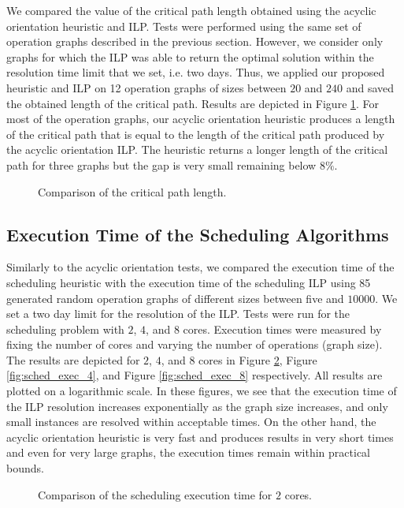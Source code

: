 We compared the value of the critical path length obtained using the acyclic orientation heuristic and ILP. Tests were performed using the same set of operation graphs described in the previous section. However, we consider only graphs for which the ILP was able to return the optimal solution within the resolution time limit that we set, i.e. two days. Thus, we applied our proposed heuristic and ILP on 12 operation graphs of sizes between $20$ and $240$ and saved the obtained length of the critical path. Results are depicted in Figure \ref{fig:orient_critpath}. For most of the operation graphs, our acyclic orientation heuristic produces a length of the critical path that is equal to the length of the critical path produced by the acyclic orientation ILP. The heuristic returns a longer length of the critical path for three graphs but the gap is very small remaining below $8\%$.  

\begin{figure}[phbt]
\centering

\caption{Comparison of the critical path length.}
\label{fig:orient_critpath}
\end{figure}

\subsection{Execution Time of the Scheduling Algorithms}

Similarly to the acyclic orientation tests, we compared the execution time of the scheduling heuristic with the execution time of the scheduling ILP using 85 generated random operation graphs of different sizes between five and $10000$. We set a two day limit for the resolution of the ILP. Tests were run for the scheduling problem with $2$, $4$, and $8$ cores. Execution times were measured by fixing the number of cores and varying the number of operations (graph size). The results are depicted for $2$, $4$, and $8$ cores in Figure \ref{fig:sched_exec_2}, Figure \ref{fig:sched_exec_4}, and Figure \ref{fig:sched_exec_8} respectively. All results are plotted on a logarithmic scale. In these figures, we see that the execution time of the ILP resolution increases exponentially as the graph size increases, and only small instances are resolved within acceptable times. On the other hand, the acyclic orientation heuristic is very fast and produces results in very short times and even for very large graphs, the execution times remain within practical bounds.

\begin{figure}[phbt]
\centering

\caption{Comparison of the scheduling execution time for $2$ cores.}
\label{fig:sched_exec_2}
\end{figure}

